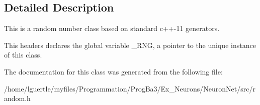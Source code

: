 \subsection{Detailed Description}
This is a random number class based on standard c++-\/11 generators.

This headers declares the global variable \+\_\+\+R\+NG, a pointer to the unique instance of this class. 

The documentation for this class was generated from the following file\+:\begin{DoxyCompactItemize}
\item 
/home/lguertle/myfiles/\+Programmation/\+Prog\+Ba3/\+Ex\+\_\+\+Neurons/\+Neuron\+Net/src/random.\+h\end{DoxyCompactItemize}
